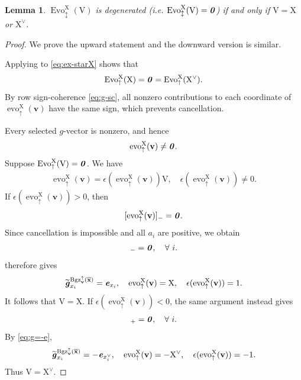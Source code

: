 \documentclass[11pt,reqno]{amsart}
\newcommand{\Neptune}{\mathord{\text{\tikz[baseline=-.5ex,scale=.13]{\draw[line width=.45pt] (0,0)--(0,1.8) (-.6,1.8)--(-.6,.8)--(.6,.8)--(.6,1.8) (-.35,.35)--(.35,.35);}}}}
\theoremstyle{plain}
\newtheorem{lemma}[theorem]{Lemma}
\theoremstyle{definition}
\numberwithin{equation}{section}
\newcommand\<{\langle}
\renewcommand\>{\rangle}
\newcommand{\on}[1]{\operatorname{#1}}
\def\vv{\mathbf{v}}
\def\sink{X}
\newcommand{\flowu}[1]{\on{evo}^{#1}_{\uparrow}}
\newcommand{\flowdu}[1]{\on{evo}_{\updownarrow}^{#1}}
\newcommand{\flowU}[1]{\on{Evo}_{\uparrow}^{#1}}
\newcommand{\flowDU}[1]{\on{Evo}_{\updownarrow}^{#1}}
\newcommand{\ccpt}[1]{\mathrm{#1}}%
\def\xevo{\ccpt{X}}%
\newcommand{\bfit}[1]{\textbf{\textit{#1}}}
\def\xx{\mathbf{x}}%
\def\gvec{\bfit{g}}
\def\supp{\on{supp}}
\newcommand{\Bgzp}[2]{\operatorname{Bgz}^{\uparrow}_{#2}(#1)}
\newcommand{\suppdu}[1]{\operatorname{\Neptune}_{\updownarrow}^{#1}}
\newcommand{\ol}[1]{\overline{#1}}
\newcommand{\DT}[1]{#1^{\vee}}
\def\Xevo{\DT{\ccpt{X}}}
\def\csum{\epsilon}
\def\tgvec{\widetilde{\gvec}}
\begin{document}
\begin{lemma}\label{lem:sing}
$\flowDU{\xevo}(\ccpt{V})$ is degenerated (i.e. $\flowDU{\xevo}(\ccpt{V})=\bfit{0}$) if and only if $\ccpt{V}=\xevo$ or $\Xevo$.
\end{lemma}

\begin{proof}
We prove the upward statement and the downward version is similar.

Applying  to \eqref{eq:ex-starX} shows that  
\begin{gather}
    \flowU{\xevo}(\xevo)=\bfit{0}=\flowU{\xevo}(\Xevo).
\end{gather}
By row sign-coherence \eqref{eq:g-sc}, all nonzero contributions to each coordinate of $\flowu{\xevo}(\vv)$ have the same sign, which prevents cancellation.

Every selected $g$-vector is nonzero, and hence
\[
\flowu{\xevo}(\vv)\ne\bfit0.
\]
Suppose $\flowU{\xevo}(\ccpt{V})=\bfit{0}$. 
We have
\begin{gather}
    \flowu{\xevo}(\vv) =\csum(\flowu{\xevo}(\vv))\ccpt{V}, 
    \quad\csum(\flowu{\xevo}(\vv))\ne0.
\end{gather}
If $\csum(\flowu{\xevo}(\vv))>0$, then
\[
[\flowu{\xevo}(\vv)]_-=\bfit0.
\]
Since cancellation is impossible and all $a_i$ are positive, we obtain
\begin{gather}
   [\tgvec^{\Bgzp{\ol\xx}{\vv}}_{x_i}]_-=\bfit{0},\quad\forall~i.
\end{gather}
 therefore gives
\begin{gather}
    \tgvec^{\Bgzp{\ol\xx}{\vv}}_{x_i}=\bfit{e}_{x_i},\quad
    \flowu{\xevo}(\vv)=\xevo,\quad
    \csum(\flowu{\xevo}(\vv))=1.
\end{gather}
It follows that $\ccpt{V}=\xevo$.
If $\csum(\flowu{\xevo}(\vv))<0$, the same argument instead gives
\begin{gather}
   [\tgvec^{\Bgzp{\ol\xx}{\vv}}_{x_i}]_+=\bfit{0},\quad\forall~i.
\end{gather}
By \eqref{eq:g=-e}, 
\begin{gather}
    \tgvec^{\Bgzp{\ol\xx}{\vv}}_{x_i}=-\bfit{e}_{\DT{x}_i},\quad
    \flowu{\xevo}(\vv)=-\Xevo,\quad
    \csum(\flowu{\xevo}(\vv))=-1.
\end{gather}
Thus $\ccpt{V}=\Xevo$. 
\end{proof}
\end{document}
